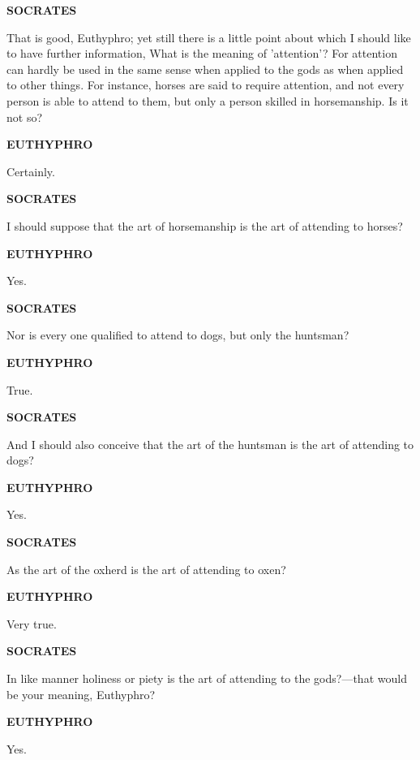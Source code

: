 \documentclass[11pt,letter]{article}
\begin{document}
\par \textbf{SOCRATES}
\par   That is good, Euthyphro; yet still there is a little point about which I should like to have further information, What is the meaning of 'attention'? For attention can hardly be used in the same sense when applied to the gods as when applied to other things. For instance, horses are said to require attention, and not every person is able to attend to them, but only a person skilled in horsemanship. Is it not so?

\par \textbf{EUTHYPHRO}
\par   Certainly.

\par \textbf{SOCRATES}
\par   I should suppose that the art of horsemanship is the art of attending to horses?

\par \textbf{EUTHYPHRO}
\par   Yes.

\par \textbf{SOCRATES}
\par   Nor is every one qualified to attend to dogs, but only the huntsman?

\par \textbf{EUTHYPHRO}
\par   True.

\par \textbf{SOCRATES}
\par   And I should also conceive that the art of the huntsman is the art of attending to dogs?

\par \textbf{EUTHYPHRO}
\par   Yes.

\par \textbf{SOCRATES}
\par   As the art of the oxherd is the art of attending to oxen?

\par \textbf{EUTHYPHRO}
\par   Very true.

\par \textbf{SOCRATES}
\par   In like manner holiness or piety is the art of attending to the gods?—that would be your meaning, Euthyphro?

\par \textbf{EUTHYPHRO}
\par   Yes.
\end{document}
